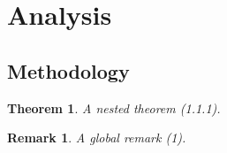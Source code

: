 \documentclass{article}
\newtheorem{thm}{Theorem}[section]
\numberwithin{thm}{subsection}
\newtheorem{remark}{Remark} %
\begin{document}
\section{Analysis}
\subsection{Methodology}

\begin{thm}
A nested theorem (1.1.1).
\end{thm}

\begin{remark}
A global remark (1).
\end{remark}
\end{document}
